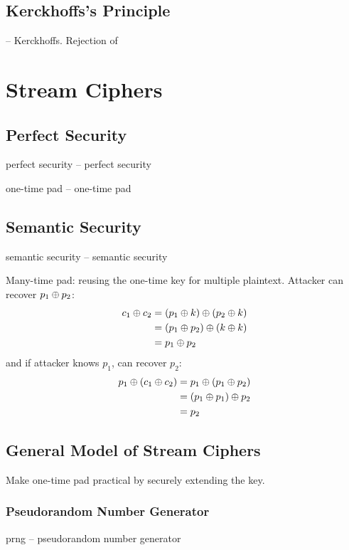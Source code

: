 \documentclass[draft]{article}
\begin{document}
\subsection{Kerckhoffs’s Principle}
 -- \glsdesc*{Kerckhoffs}. Rejection of 
\section{Stream Ciphers}
\subsection{Perfect Security}
\Gls{perfect security} -- \glsdesc*{perfect security}

\Gls{one-time pad} -- \glsdesc*{one-time pad}

\subsection{Semantic Security}
\Gls{semantic security} -- \glsdesc*{semantic security}

Many-time pad: reusing the one-time key for multiple plaintext. Attacker can recover $p_1 \oplus p_2$:
\begin{align*}c_1 \oplus c_2
     & = (p_1 \oplus k) \oplus (p_2 \oplus k) \\
     & = (p_1 \oplus p_2) \oplus (k \oplus k) \\
     & = p_1 \oplus p_2
\end{align*}
and if attacker knows $p_1$, can recover $p_2$:
\begin{align*}p_1 \oplus (c_1 \oplus c_2)
     & = p_1 \oplus (p_1 \oplus p_2) \\
     & = (p_1 \oplus p_1) \oplus p_2 \\
     & = p_2
\end{align*}
\subsection{General Model of Stream Ciphers}
Make one-time pad practical by securely extending the key.
\subsubsection*{Pseudorandom Number Generator}
\acrfull{prng} -- \glsdesc*{pseudorandom number generator}
\end{document}

